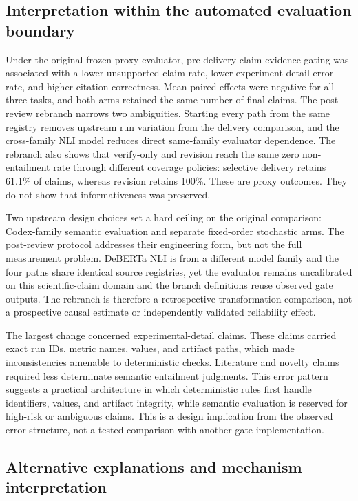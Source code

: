 \documentclass[11pt]{article}
\begin{document}
\subsection{Interpretation within the automated evaluation boundary}

Under the original frozen proxy evaluator, pre-delivery claim-evidence gating was associated with a lower unsupported-claim rate, lower experiment-detail error rate, and higher citation correctness. Mean paired effects were negative for all three tasks, and both arms retained the same number of final claims. The post-review rebranch narrows two ambiguities. Starting every path from the same registry removes upstream run variation from the delivery comparison, and the cross-family NLI model reduces direct same-family evaluator dependence. The rebranch also shows that verify-only and revision reach the same zero non-entailment rate through different coverage policies: selective delivery retains 61.1\% of claims, whereas revision retains 100\%. These are proxy outcomes. They do not show that informativeness was preserved.

Two upstream design choices set a hard ceiling on the original comparison: Codex-family semantic evaluation and separate fixed-order stochastic arms. The post-review protocol addresses their engineering form, but not the full measurement problem. DeBERTa NLI is from a different model family and the four paths share identical source registries, yet the evaluator remains uncalibrated on this scientific-claim domain and the branch definitions reuse observed gate outputs. The rebranch is therefore a retrospective transformation comparison, not a prospective causal estimate or independently validated reliability effect.

The largest change concerned experimental-detail claims. These claims carried exact run IDs, metric names, values, and artifact paths, which made inconsistencies amenable to deterministic checks. Literature and novelty claims required less determinate semantic entailment judgments. This error pattern suggests a practical architecture in which deterministic rules first handle identifiers, values, and artifact integrity, while semantic evaluation is reserved for high-risk or ambiguous claims. This is a design implication from the observed error structure, not a tested comparison with another gate implementation.

\subsection{Alternative explanations and mechanism interpretation}
\end{document}
